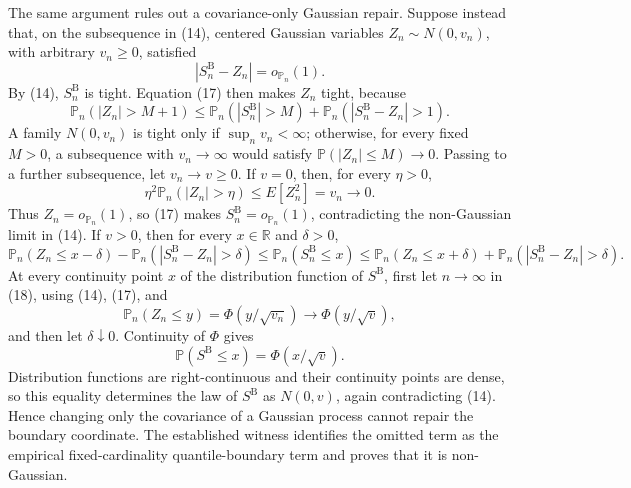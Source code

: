 The same argument rules out a covariance-only Gaussian repair.  Suppose instead that, on the subsequence in (14), centered Gaussian variables \(Z_n\sim N(0,v_n)\), with arbitrary \(v_n\geq0\), satisfied
\[
 |S_n^{\mathrm B}-Z_n|=o_{\mathbb P_n}(1). \tag{17}
\]
By (14), \(S_n^{\mathrm B}\) is tight.  Equation (17) then makes \(Z_n\) tight, because
\[
 \mathbb P_n(|Z_n|>M+1)
 \leq \mathbb P_n(|S_n^{\mathrm B}|>M)
 +\mathbb P_n(|S_n^{\mathrm B}-Z_n|>1).
\]
A family \(N(0,v_n)\) is tight only if \(\sup_n v_n<\infty\); otherwise, for every fixed \(M>0\), a subsequence with \(v_n\to\infty\) would satisfy \(\mathbb P(|Z_n|\leq M)\to0\).  Passing to a further subsequence, let \(v_n\to v\geq0\).  If \(v=0\), then, for every \(\eta>0\),
\[
 \eta^2\mathbb P_n(|Z_n|>\eta)\leq E[Z_n^2]=v_n\longrightarrow0.
\]
Thus \(Z_n=o_{\mathbb P_n}(1)\), so (17) makes \(S_n^{\mathrm B}=o_{\mathbb P_n}(1)\), contradicting the non-Gaussian limit in (14).  If \(v>0\), then for every \(x\in\mathbb R\) and \(\delta>0\),
\[
 \mathbb P_n(Z_n\leq x-\delta)-\mathbb P_n(|S_n^{\mathrm B}-Z_n|>\delta)
 \leq \mathbb P_n(S_n^{\mathrm B}\leq x)
 \leq \mathbb P_n(Z_n\leq x+\delta)+\mathbb P_n(|S_n^{\mathrm B}-Z_n|>\delta). \tag{18}
\]
At every continuity point \(x\) of the distribution function of \(S^{\mathrm B}\), first let \(n\to\infty\) in (18), using (14), (17), and
\[
 \mathbb P_n(Z_n\leq y)=\Phi(y/\sqrt{v_n})\longrightarrow\Phi(y/\sqrt v),
\]
and then let \(\delta\downarrow0\).  Continuity of \(\Phi\) gives
\[
 \mathbb P(S^{\mathrm B}\leq x)=\Phi(x/\sqrt v).
\]
Distribution functions are right-continuous and their continuity points are dense, so this equality determines the law of \(S^{\mathrm B}\) as \(N(0,v)\), again contradicting (14).  Hence changing only the covariance of a Gaussian process cannot repair the boundary coordinate.  The established witness identifies the omitted term as the empirical fixed-cardinality quantile-boundary term and proves that it is non-Gaussian.

